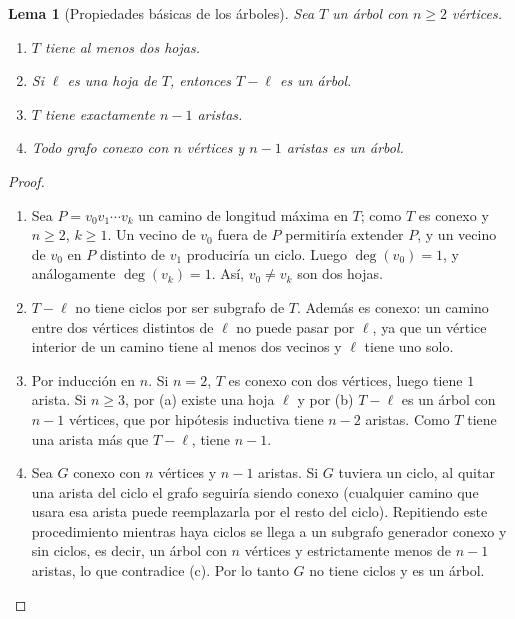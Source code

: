 \documentclass[12pt,a4paper]{article}
\theoremstyle{profesional}
\newtheorem{lemma}[teorema]{Lema}
\theoremstyle{definicion-style}
\theoremstyle{observacion-style}
\begin{document}
\begin{lemma}[Propiedades básicas de los árboles]\label{lema:arboles}
    Sea \( T \) un árbol con \( n \geq 2 \) vértices.
    \begin{enumerate}[label=(\alph*)]
        \item \( T \) tiene al menos dos hojas.
        \item Si \( \ell \) es una hoja de \( T \), entonces \( T - \ell \) es un árbol.
        \item \( T \) tiene exactamente \( n - 1 \) aristas.
        \item Todo grafo conexo con \( n \) vértices y \( n - 1 \) aristas es un árbol.
    \end{enumerate}
\end{lemma}
\begin{proof}
    \begin{enumerate}[label=(\alph*)]
        \item Sea \( P = v_0 v_1 \cdots v_k \) un camino de longitud máxima en \( T \); como \( T \) es conexo y \( n \geq 2 \), \( k \geq 1 \). Un vecino de \( v_0 \) fuera de \( P \) permitiría extender \( P \), y un vecino de \( v_0 \) en \( P \) distinto de \( v_1 \) produciría un ciclo. Luego \( \deg(v_0) = 1 \), y análogamente \( \deg(v_k) = 1 \). Así, \( v_0 \neq v_k \) son dos hojas.
        \item \( T - \ell \) no tiene ciclos por ser subgrafo de \( T \). Además es conexo: un camino entre dos vértices distintos de \( \ell \) no puede pasar por \( \ell \), ya que un vértice interior de un camino tiene al menos dos vecinos y \( \ell \) tiene uno solo.
        \item Por inducción en \( n \). Si \( n = 2 \), \( T \) es conexo con dos vértices, luego tiene \( 1 \) arista. Si \( n \geq 3 \), por (a) existe una hoja \( \ell \) y por (b) \( T - \ell \) es un árbol con \( n - 1 \) vértices, que por hipótesis inductiva tiene \( n - 2 \) aristas. Como \( T \) tiene una arista más que \( T - \ell \), tiene \( n - 1 \).
        \item Sea \( G \) conexo con \( n \) vértices y \( n - 1 \) aristas. Si \( G \) tuviera un ciclo, al quitar una arista del ciclo el grafo seguiría siendo conexo (cualquier camino que usara esa arista puede reemplazarla por el resto del ciclo). Repitiendo este procedimiento mientras haya ciclos se llega a un subgrafo generador conexo y sin ciclos, es decir, un árbol con \( n \) vértices y estrictamente menos de \( n - 1 \) aristas, lo que contradice (c). Por lo tanto \( G \) no tiene ciclos y es un árbol.
    \end{enumerate}
\end{proof}
\end{document}

